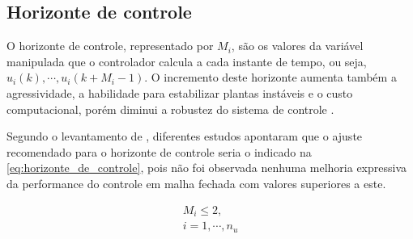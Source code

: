 \subsection{Horizonte de controle}
\label{subsec:horizonte_de_controle}

O horizonte de controle, representado por $M_i$, são os valores da variável manipulada que o controlador
calcula a cada instante de tempo, ou seja, $u_i(k), \cdots, u_i(k+M_i-1)$. O incremento deste horizonte
aumenta também a agressividade, a habilidade para estabilizar plantas instáveis e o custo computacional,
porém diminui a robustez do sistema de controle \cite{Alhajeri2020}.

Segundo o levantamento de , diferentes estudos apontaram que o ajuste recomendado
para o horizonte de controle seria o indicado na \cref{eq:horizonte_de_controle}, pois não foi observada
nenhuma melhoria expressiva da performance do controle em malha fechada com valores superiores a este.

\begin{equation}
	\label{eq:horizonte_de_controle}
	\begin{aligned}
		M_i \leqslant 2,			\\
		i = 1, \cdots, n_u
	\end{aligned}
\end{equation}
